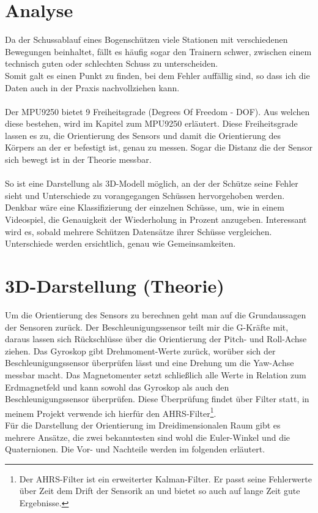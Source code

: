 \section{Analyse}
Da der Schussablauf eines Bogenschützen viele Stationen mit verschiedenen Bewegungen 
beinhaltet, fällt es häufig sogar den Trainern schwer, zwischen einem technisch guten
oder schlechten Schuss zu unterscheiden.\\ 
Somit galt es einen Punkt zu finden, bei dem Fehler auffällig sind, so dass ich die Daten auch in 
der Praxis nachvollziehen kann.\\
\\
Der MPU9250 bietet 9 Freiheitsgrade (Degrees Of Freedom - DOF). Aus welchen diese bestehen, wird
im Kapitel zum MPU9250 erläutert. Diese Freiheitsgrade lassen es zu, die Orientierung des Sensors 
und damit die Orientierung des Körpers an der er befestigt ist, genau zu messen. Sogar die Distanz 
die der Sensor sich bewegt ist in der Theorie messbar.\\
\\
So ist eine Darstellung als 3D-Modell möglich, an der der Schütze seine Fehler sieht und Unterschiede
zu vorangegangen Schüssen hervorgehoben werden. \\
Denkbar wäre eine Klassifizierung der einzelnen Schüsse, um, wie in einem Videospiel, die Genauigkeit
der Wiederholung in Prozent anzugeben. Interessant wird es, sobald mehrere Schützen Datensätze
ihrer Schüsse vergleichen. Unterschiede werden ersichtlich, genau wie Gemeinsamkeiten.\\

\section{3D-Darstellung (Theorie)}
Um die Orientierung des Sensors zu berechnen geht man auf die Grundaussagen der Sensoren zurück. Der 
Beschleunigungssensor teilt mir die G-Kräfte mit, daraus lassen sich Rückschlüsse über die Orientierung 
der Pitch- und Roll-Achse ziehen. Das Gyroskop gibt Drehmoment-Werte zurück, worüber sich der Beschleunigungssensor
überprüfen lässt und eine Drehung um die Yaw-Achse messbar macht. Das Magnetomenter setzt schließlich alle Werte in
Relation zum Erdmagnetfeld und kann sowohl das Gyroskop als auch den Beschleunigungssensor überprüfen. Diese Überprüfung
findet über Filter statt, in meinem Projekt verwende ich hierfür den AHRS-Filter\footnote{Der AHRS-Filter 
ist ein erweiterter Kalman-Filter. Er passt seine Fehlerwerte über Zeit dem Drift der Sensorik an und bietet so auch 
auf lange Zeit gute Ergebnisse.}. \\
Für die Darstellung der Orientierung im Dreidimensionalen Raum gibt es mehrere Ansätze, die zwei bekanntesten 
sind wohl die Euler-Winkel und die Quaternionen. Die Vor- und Nachteile werden im folgenden erläutert.

